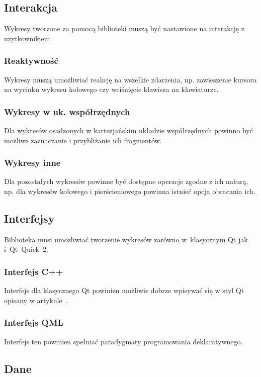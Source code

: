 \documentclass[11pt,twoside,a4paper,final]{article}
\begin{document}
\subsection{Interakcja}
Wykresy tworzone za pomocą biblioteki muszą być nastawione na interakcję z użytkownikiem.

\subsubsection{Reaktywność}
Wykresy muszą umożliwiać reakcję na wszelkie zdarzenia, np. zawieszenie kursora na wycinku wykresu kołowego czy wciśnięcie klawisza na klawiaturze.

\subsubsection{Wykresy w uk. współrzędnych} 
Dla wykresów osadzonych w kartezjańskim układzie współrzędnych powinno być możliwe zaznaczanie i przybliżanie ich fragmentów. 

\subsubsection{Wykresy inne} 
Dla pozostałych wykresów powinne być dostępne operacje zgodne z ich naturą, np. dla wykresów kołowego i pierścieniowego powinna istnieć opcja obracania ich. 


\subsection{Interfejsy}
Biblioteka musi umożliwiać tworzenie wykresów zarówno w~klasycznym Qt jak i~Qt~Quick~2. 

\subsubsection{Interfejs C++}
Interfejs dla klasycznego Qt powinien możliwie dobrze wpisywać się w styl Qt opisany w artykule~\cite{qt-style-API}.

\subsubsection{Interfejs QML}
Interfejs ten powinien spełniać paradygmaty programowania deklaratywnego.

\subsection{Dane}
\end{document}
